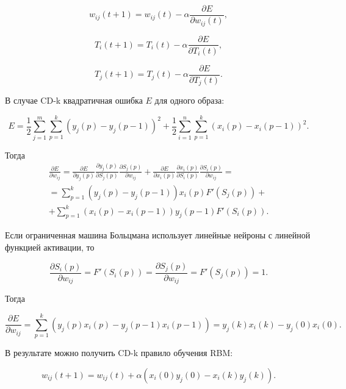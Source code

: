 \begin{equation}
w_{ij}(t+1)=w_{ij}(t)-\alpha\frac{\partial E}{\partial w_{ij}(t)},
\end{equation}		

\begin{equation}
T_{i}(t+1)=T_{i}(t)-\alpha\frac{\partial E}{\partial T_{i}(t)},
\end{equation}		

\begin{equation}
T_{j}(t+1)=T_{j}(t)-\alpha\frac{\partial E}{\partial T_{j}(t)}.
\end{equation}

В случае CD-k квадратичная ошибка $E$ для одного образа:

\begin{equation*}
E=\frac{1}{2}\sum_{j=1}^m\sum_{p=1}^k (y_j(p)-y_j(p-1))^2+\frac{1}{2}\sum_{i=1}^n\sum_{p=1}^k (x_i(p)-x_i(p-1))^2.
\end{equation*}

Тогда
\begin{multline*}
    \frac{\partial E}{\partial w_{ij}}=\frac{\partial E}{\partial y_j(p)}\frac{\partial y_j(p)}{\partial S_j(p)}\frac{\partial S_j(p)}{\partial w_{ij}}+\frac{\partial E}{\partial x_i(p)}\frac{\partial x_i(p)}{\partial S_i(p)}\frac{\partial S_i(p)}{\partial w_{ij}}=\\=\sum_{p=1}^k (y_j(p)-y_j(p-1))x_i(p)F'(S_j(p))+\\+\sum_{p=1}^k (x_i(p)-x_i(p-1))y_j(p-1)F'(S_i(p)).
\end{multline*}

Если ограниченная машина Больцмана использует линейные нейроны с линейной функцией активации, то

\begin{equation*}
    \frac{\partial S_i(p)}{\partial w_{ij}}=F'(S_i(p))=\frac{\partial S_j(p)}{\partial w_{ij}}=F'(S_j(p))=1.
\end{equation*}

Тогда

\begin{equation*}
    \frac{\partial E}{\partial w_{ij}}=\sum_{p=1}^k (y_j(p)x_i(p)-y_j(p-1)x_i(p-1))=y_j(k)x_i(k)-y_j(0)x_i(0).
\end{equation*}

В результате можно получить CD-k правило обучения RBM:

\begin{equation*}
    w_{ij}(t+1)=w_{ij}(t)+\alpha(x_i(0)y_j(0)-x_i(k)y_j(k)).
\end{equation*}

